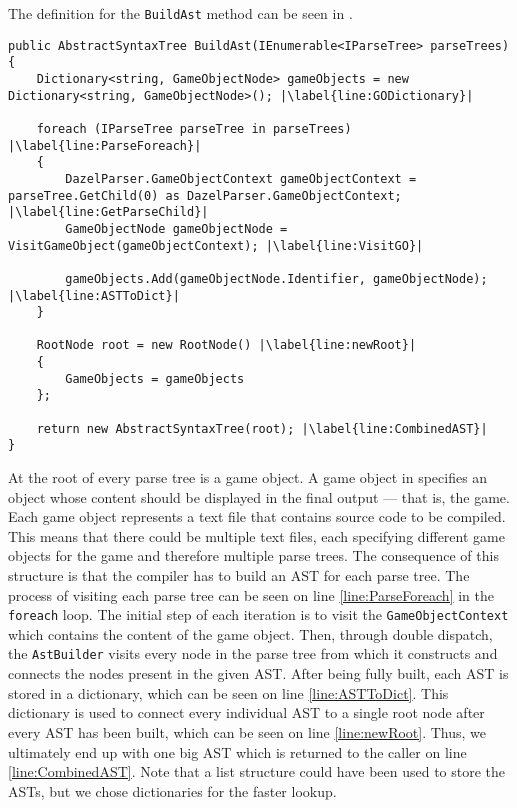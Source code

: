 The definition for the \texttt{BuildAst} method can be seen in .

\begin{lstlisting}[language=CSharp, caption={The \texttt{BuildAst} method.}, label={lst:BuildAstMethod},escapechar=|]
public AbstractSyntaxTree BuildAst(IEnumerable<IParseTree> parseTrees)
{
    Dictionary<string, GameObjectNode> gameObjects = new Dictionary<string, GameObjectNode>(); |\label{line:GODictionary}|
    
    foreach (IParseTree parseTree in parseTrees) |\label{line:ParseForeach}|
    {
        DazelParser.GameObjectContext gameObjectContext = parseTree.GetChild(0) as DazelParser.GameObjectContext; |\label{line:GetParseChild}|
        GameObjectNode gameObjectNode = VisitGameObject(gameObjectContext); |\label{line:VisitGO}|
        
        gameObjects.Add(gameObjectNode.Identifier, gameObjectNode); |\label{line:ASTToDict}|
    }

    RootNode root = new RootNode() |\label{line:newRoot}|
    {
        GameObjects = gameObjects
    };
    
    return new AbstractSyntaxTree(root); |\label{line:CombinedAST}|
}
\end{lstlisting}

At the root of every parse tree is a game object. A game object in \dazel{} specifies an object whose content should be displayed in the final output — that is, the game. Each game object represents a text file that contains source code to be compiled. This means that there could be multiple text files, each specifying different game objects for the game and therefore multiple parse trees. 
The consequence of this structure is that the compiler has to build an AST for each parse tree. The process of visiting each parse tree can be seen on line \ref{line:ParseForeach} in the \texttt{foreach} loop. 
The initial step of each iteration is to visit the \texttt{GameObjectContext} which contains the content of the game object.
Then, through double dispatch, the \texttt{AstBuilder} visits every node in the parse tree from which it  constructs and connects the nodes present in the given AST.
After being fully built, each AST is stored in a dictionary, which can be seen on line \ref{line:ASTToDict}. 
This dictionary is used to connect every individual AST to a single root node after every AST has been built, which can be seen on line \ref{line:newRoot}. Thus, we ultimately end up with one big AST which is returned to the caller on line \ref{line:CombinedAST}. Note that a list structure could have been used to store the ASTs, but we chose dictionaries for the faster lookup.
 
